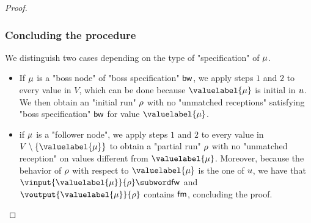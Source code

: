 \begin{proof}
% 	

 
\subsubsection{Concluding the procedure}
We distinguish two cases depending on the type of "specification" of $\mu$.
\begin{itemize}
\item If $\mu$ is a "boss node" of "boss specification" $\mathsf{bw}$, we apply steps $1$ and $2$ to every value in $V$, which can be done because $\valuelabel{\node}$ is initial in $u$. We then obtain an "initial run" $\rho$ with no "unmatched receptions" satisfying "boss specification" $\mathsf{bw}$ for value $\valuelabel{\node}$.
\item if $\mu$ is a "follower node", we apply steps $1$ and $2$ to every value in $V \setminus \set{\valuelabel{\node}}$ to obtain a "partial run" $\rho$ with no "unmatched reception" on values different from $\valuelabel{\node}$. Moreover, because the behavior of $\rho$ with respect to $\valuelabel{\node}$ is the one of $u$, we have that $\vinput{\valuelabel{\node}}{\run} \subword \followwordspec$ and $\voutput{\valuelabel{\node}}{\run}$ contains $\mathsf{fm}$, concluding the proof. 
\end{itemize}
\end{proof}